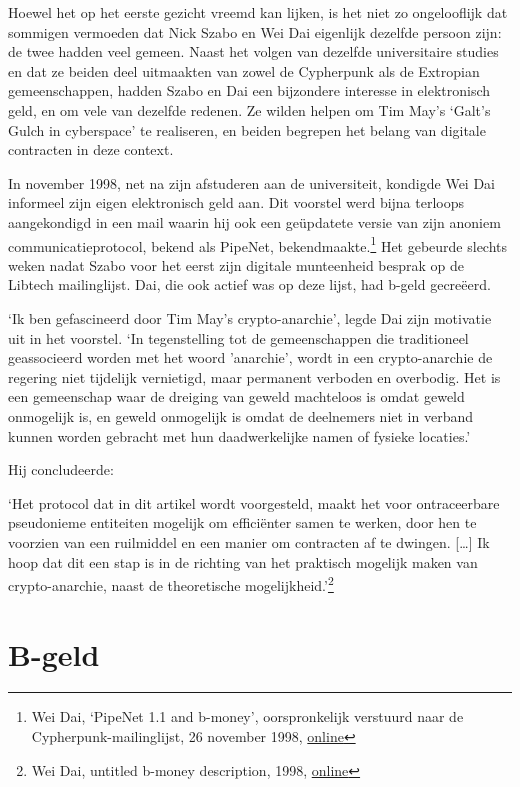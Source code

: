 \documentclass[
  a5paper,
  smalldemyvopaper,11pt,twoside,onecolumn,openright,extrafontsizes]{memoir}
\begin{document}
Hoewel het op het eerste gezicht vreemd kan lijken, is het niet zo
ongelooflijk dat sommigen vermoeden dat Nick Szabo en Wei Dai eigenlijk
dezelfde persoon zijn: de twee hadden veel gemeen. Naast het volgen van
dezelfde universitaire studies en dat ze beiden deel uitmaakten van
zowel de Cypherpunk als de Extropian gemeenschappen, hadden Szabo en Dai
een bijzondere interesse in elektronisch geld, en om vele van dezelfde
redenen. Ze wilden helpen om Tim May's `Galt's Gulch in cyberspace' te
realiseren, en beiden begrepen het belang van digitale contracten in
deze context.

In november 1998, net na zijn afstuderen aan de universiteit, kondigde
Wei Dai informeel zijn eigen elektronisch geld aan. Dit voorstel werd
bijna terloops aangekondigd in een mail waarin hij ook een geüpdatete
versie van zijn anoniem communicatieprotocol, bekend als PipeNet,
bekendmaakte.\footnote{Wei Dai, `PipeNet 1.1 and b-money',
  oorspronkelijk verstuurd naar de Cypherpunk-mailinglijst, 26 november
  1998,
  \href{https://cypherpunks.venona.com/date/1998/11/msg00941.html}{online}}
Het gebeurde slechts weken nadat Szabo voor het eerst zijn digitale
munteenheid besprak op de Libtech mailinglijst. Dai, die ook actief was
op deze lijst, had b-geld gecreëerd.

`Ik ben gefascineerd door Tim May's crypto-anarchie', legde Dai zijn
motivatie uit in het voorstel. `In tegenstelling tot de gemeenschappen
die traditioneel geassocieerd worden met het woord 'anarchie', wordt in
een crypto-anarchie de regering niet tijdelijk vernietigd, maar
permanent verboden en overbodig. Het is een gemeenschap waar de dreiging
van geweld machteloos is omdat geweld onmogelijk is, en geweld
onmogelijk is omdat de deelnemers niet in verband kunnen worden gebracht
met hun daadwerkelijke namen of fysieke locaties.'

Hij concludeerde:

`Het protocol dat in dit artikel wordt voorgesteld, maakt het voor
ontraceerbare pseudonieme entiteiten mogelijk om efficiënter samen te
werken, door hen te voorzien van een ruilmiddel en een manier om
contracten af te dwingen. {[}\ldots{]} Ik hoop dat dit een stap is in de
richting van het praktisch mogelijk maken van crypto-anarchie, naast de
theoretische mogelijkheid.'\footnote{Wei Dai, untitled b-money
  description, 1998,
  \href{https://web.archive.org/web/20090415130807/https://www.weidai.com/bmoney.txt}{online}}

\section{B-geld}\label{b-geld}
\end{document}
